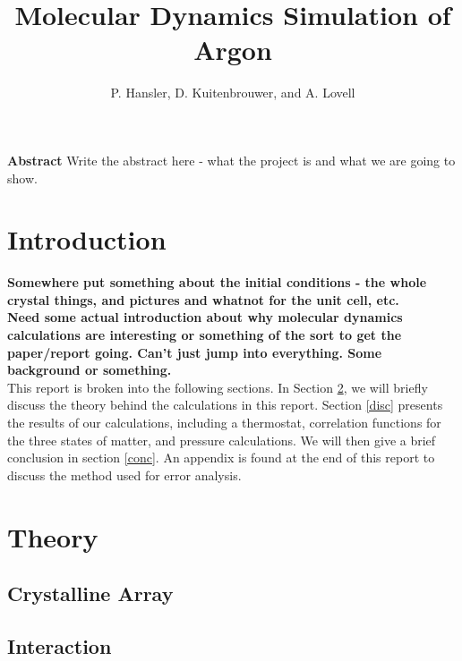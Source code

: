 \documentclass{article}
\begin{document}
\title{Molecular Dynamics Simulation of Argon}
\author{P. Hansler, D. Kuitenbrouwer, and A. Lovell}
\maketitle

\begin{center}
\textbf{Abstract}  Write the abstract here - what the project is and what we are going to show.  \\
\end{center}

\begin{multicols}{2}

\section{Introduction}

\textbf{Somewhere put something about the initial conditions - the whole crystal things, and pictures and whatnot for the unit cell, etc.} \\

\textbf{Need some actual introduction about why molecular dynamics calculations are interesting or something of the sort to get the paper/report going.  Can't just jump into everything.  Some background or something.} \\

This report is broken into the following sections.  In Section \ref{theory}, we will briefly discuss the theory behind the calculations in this report.  Section \ref{disc} presents the results of our calculations, including a thermostat, correlation functions for the three states of matter, and pressure calculations.  We will then give a brief conclusion in section \ref{conc}.  An appendix is found at the end of this report to discuss the method used for error analysis.  

\section{Theory}
\label{theory}

\subsection{Crystalline Array}

\subsection{Interaction}


\end{multicols}
\end{document}
